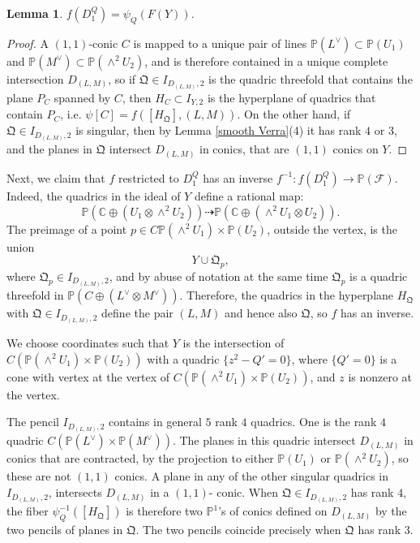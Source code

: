 \documentclass[a4paper,11pt]{amsart}
\newtheorem{lem}[thm]{Lemma}
\theoremstyle{definition}
\numberwithin{equation}{section}
\numberwithin{equation}{section} \theoremstyle{definition}
\begin{document}
\begin{lem}
$f(D^Q_1)=\psi_Q(F(Y))$.
\end{lem}
\begin{proof}
A $(1,1)$-conic $C$ is mapped to a unique pair of lines ${{\mathbb{P}}}(L^{\vee})\subset {{\mathbb{P}}}( U_1)$ and ${{\mathbb{P}}}(M^{\vee})\subset{{\mathbb{P}}}(\wedge^2 U_2)$, 
and is therefore contained in a unique complete intersection $D_{(L,M)}$, so if ${\mathfrak{Q}}\in I_{D_{(L,M)},2}$ is the quadric threefold that contains the plane $P_C$ spanned by $C$, then $H_C\subset I_{Y,2}$ is the hyperplane of quadrics that contain $P_C$, i.e. $\psi{[C]}=f([H_{\mathfrak{Q}}],(L,M))$.  On the other hand, if  ${\mathfrak{Q}}\in I_{D_{(L,M)},2}$ is singular, then by Lemma \ref{smooth Verra}(4) it has rank $4$ or $3$, and the planes in ${\mathfrak{Q}}$ intersect $D_{(L,M)}$ in conics, that are $(1,1)$ conics on $Y$.
\end{proof}

Next, we claim that $f$ restricted to $D^Q_1$ has an inverse $f^{-1}:f(D^Q_1)\to {{\mathbb{P}}}({{\mathcal F}})$. Indeed,
the quadrics in the ideal of $Y$ define a rational map: 
\[
{{\mathbb{P}}}({{\mathbb{C}  }}\oplus ( U_1\otimes \wedge^2 U_2))\dashrightarrow {{\mathbb{P}}}({{\mathbb{C}  }}\oplus (\wedge^2 U_1\otimes U_2)).
\]
The preimage of a point $p \in C{{\mathbb{P}}}(\wedge^2 U_1)\times {{\mathbb{P}}}(U_2)$, outside the vertex,  is the union 
\[
Y\cup {\mathfrak{Q}}_p,
\]
 where ${\mathfrak{Q}}_p\in I_{D_{(L,M)},2}$, and by abuse of notation at the same time ${\mathfrak{Q}}_p$ is a quadric threefold  in ${{\mathbb{P}}}(C\oplus (L^{\vee}\otimes M^{\vee}))$.  Therefore, the quadrics in the hyperplane $H_{\mathfrak{Q}}$  with ${\mathfrak{Q}}\in I_{D_{(L,M)},2}$ define the pair $(L,M)$ and hence also ${\mathfrak{Q}}$, so $f$ has an inverse.
 
 We choose coordinates such that $Y$ is the intersection of $C({{\mathbb{P}}}(\wedge^2 U_1)\times {{\mathbb{P}}}(U_2))$ with a quadric $\{ z^2-Q'=0\}$, where $\{Q'=0\}$ is a cone with vertex at the vertex of $C({{\mathbb{P}}}(\wedge^2 U_1)\times {{\mathbb{P}}}(U_2))$, and $z$ is nonzero at the vertex.  

 The pencil  $I_{D_{(L,M)},2}$ contains in general $5$ rank $4$ quadrics.  One is the rank $4$ quadric $C({{\mathbb{P}}}(L^{\vee})\times {{\mathbb{P}}}(M^{\vee}))$.  The planes in this quadric intersect $D_{(L,M)}$ in conics that are contracted, by the projection to either ${{\mathbb{P}}}( U_1)$ or ${{\mathbb{P}}}(\wedge^2 U_2)$, so these are not $(1,1)$ conics.  
 A plane in any of the other singular quadrics in $I_{D_{(L,M)},2}$, intersects $D_{(L,M)}$ in a $(1,1)$- conic.  When ${\mathfrak{Q}}\in I_{D_{(L,M)},2}$ has rank $4$,
the fiber  $\psi_Q^{-1} ([H_{\mathfrak{Q}}])$ is therefore two ${{\mathbb{P}}}^1$'s of conics defined on $D_{(L,M)}$ by the two pencils of planes in ${\mathfrak{Q}}$.
The two pencils coincide precisely when ${\mathfrak{Q}}$ has rank $3$. 
\end{document}
